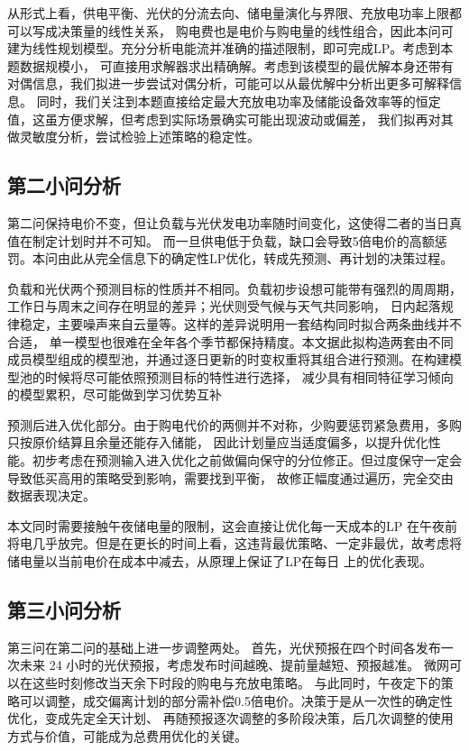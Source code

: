 \documentclass[zihao=-4,a4paper,fontset=none]{ctexart}
\begin{document}
从形式上看，供电平衡、光伏的分流去向、储电量演化与界限、充放电功率上限都可以写成决策量的线性关系，
购电费也是电价与购电量的线性组合，因此本问可建为线性规划模型。充分分析电能流并准确的描述限制，即可完成LP。考虑到本题数据规模小，
可直接用求解器求出精确解。考虑到该模型的最优解本身还带有对偶信息，我们拟进一步尝试对偶分析，可能可以从最优解中分析出更多可解释信息。
同时，我们关注到本题直接给定最大充放电功率及储能设备效率等的恒定值，这虽方便求解，但考虑到实际场景确实可能出现波动或偏差，
我们拟再对其做灵敏度分析，尝试检验上述策略的稳定性。

\subsection{第二小问分析}

第二问保持电价不变，但让负载与光伏发电功率随时间变化，这使得二者的当日真值在制定计划时并不可知。
而一旦供电低于负载，缺口会导致5倍电价的高额惩罚。本问由此从完全信息下的确定性LP优化，转成先预测、再计划的决策过程。

负载和光伏两个预测目标的性质并不相同。负载初步设想可能带有强烈的周周期，工作日与周末之间存在明显的差异；光伏则受气候与天气共同影响，
日内起落规律稳定，主要噪声来自云量等。这样的差异说明用一套结构同时拟合两条曲线并不合适，
单一模型也很难在全年各个季节都保持精度。本文据此拟构造两套由不同成员模型组成的模型池，并通过逐日更新的时变权重将其组合进行预测。在构建模型池的时候将尽可能依照预测目标的特性进行选择，
减少具有相同特征学习倾向的模型累积，尽可能做到学习优势互补

预测后进入优化部分。由于购电代价的两侧并不对称，少购要惩罚紧急费用，多购只按原价结算且余量还能存入储能，
因此计划量应当适度偏多，以提升优化性能。初步考虑在预测输入进入优化之前做偏向保守的分位修正。但过度保守一定会导致低买高用的策略受到影响，需要找到平衡，
故修正幅度通过遍历，完全交由数据表现决定。

本文同时需要接触午夜储电量的限制，这会直接让优化每一天成本的LP
在午夜前将电几乎放完。但是在更长的时间上看，这违背最优策略、一定非最优，故考虑将储电量以当前电价在成本中减去，从原理上保证了LP在每日
上的优化表现。

\subsection{第三小问分析}

第三问在第二问的基础上进一步调整两处。
首先，光伏预报在四个时间各发布一次未来 24 小时的光伏预报，考虑发布时间越晚、提前量越短、预报越准。
微网可以在这些时刻修改当天余下时段的购电与充放电策略。
与此同时，午夜定下的策略可以调整，成交偏离计划的部分需补偿0.5倍电价。决策于是从一次性的确定性优化，变成先定全天计划、
再随预报逐次调整的多阶段决策，后几次调整的使用方式与价值，可能成为总费用优化的关键。
\end{document}
